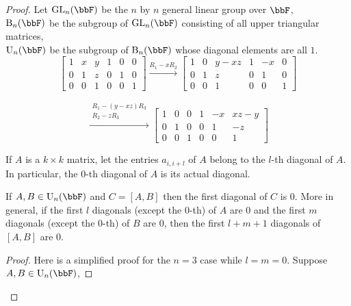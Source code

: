 \begin{proof}

Let $\mathrm{GL}_n(\bbF)$ be the $n$ by $n$ general linear group over $\bbF$,\\ $\mathrm{B}_n(\bbF)$ be the subgroup of $\mathrm{GL}_n(\bbF)$ consisting of all upper triangular matrices,\\ $\mathrm{U}_n(\bbF)$ be the subgroup of $\mathrm{B}_n(\bbF)$ whose diagonal elements are all $1$.\\


$$
\left[\begin{array}{lll|lll}{1} & {x} & {y} & {1} & {0} & {0} \\ {0} & {1} & {z} & {0} & {1} & {0} \\ {0} & {0} & {1} & {0} & {0} & {1}\end{array}\right] \stackrel{R_{1}-x R_{2}}{\longrightarrow}
\left[
    \begin{array}{ccc|ccc}
        {1} & {0} & {y-x z} & {1} & {-x} & {0} \\
        {0} & {1} & {z} & {0} & {1} & {0}  \\
        {0} & {0} & {1} & {0} & {0} & {1} 
    \end{array}
\right]
$$

$$
\stackrel{\begin{array}{c}{R_{1}-(y-x z) R_{3}} \\ {R_{2}-z R_{3}}\end{array} }{\longrightarrow}
\left[\begin{array}{ccc|ccc}
{1} & {0} & {0} & {1} & {-x} & {x z-y} \\ 
{0} & {1} & {0} & {0} & {1} & {-z} \\
{0} & {0} & {1} & {0} & {0} & {1}
\end{array}\right]
$$



If $A$ is a $k \times k$ matrix, let the entries $a_{i,i+l}$ of $A$ belong to the  $l$-th diagonal of $A$. In particular, the $0$-th diagonal of $A$ is its actual diagonal.
\begin{lemma}
    If $A,B\in \mathrm{U}_n(\bbF)$ and $C=[A,B]$ then the first diagonal of $C$ is 0. More in general, if the first $l$ diagonals (except the $0$-th) of $A$ are $0$ and the first $m$ diagonals (except the $0$-th) of $B$ are $0$, then the first $l+m+1$ diagonals of $[A,B]$ are 0.
\end{lemma}
\begin{proof}
    Here is a simplified proof for the $n=3$ case while $l=m=0$.
    Suppose $A,B\in \mathrm{U}_n(\bbF)$,


\end{proof}
\end{proof}
